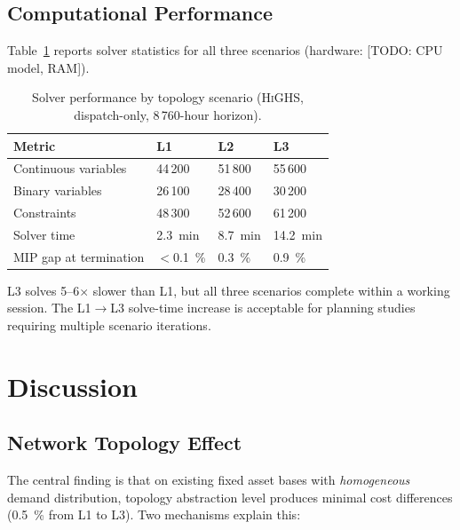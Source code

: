 \documentclass[a4paper,fleqn]{cas-sc}
\newcommand{\highs}{\textsc{HiGHS}}
\begin{document}
\subsection{Computational Performance}

Table~\ref{tab:solver} reports solver statistics for all three scenarios
(hardware: [TODO: CPU model, RAM]).

\begin{table}
\caption{Solver performance by topology scenario (\highs{}, dispatch-only,
         8\,760-hour horizon).}
\label{tab:solver}
\begin{tabularx}{\linewidth}{lXXX}
\toprule
Metric & L1 & L2 & L3 \\
\midrule
Continuous variables & 44\,200 & 51\,800 & 55\,600 \\
Binary variables     & 26\,100 & 28\,400 & 30\,200 \\
Constraints          & 48\,300 & 52\,600 & 61\,200 \\
Solver time          & \SI{2.3}{min} & \SI{8.7}{min} & \SI{14.2}{min} \\
MIP gap at termination & $<$\SI{0.1}{\percent} & \SI{0.3}{\percent} & \SI{0.9}{\percent} \\
\bottomrule
\end{tabularx}
\end{table}

L3 solves \numrange{5}{6}$\times$ slower than L1, but all three scenarios
complete within a working session.  The L1$\to$L3 solve-time increase is
acceptable for planning studies requiring multiple scenario iterations.

\section{Discussion}
\label{sec:discussion}

\subsection{Network Topology Effect}

The central finding is that on existing fixed asset bases with
\emph{homogeneous} demand distribution, topology abstraction level produces
minimal cost differences (\SI{0.5}{\percent} from L1 to L3).  Two mechanisms
explain this:
\end{document}
